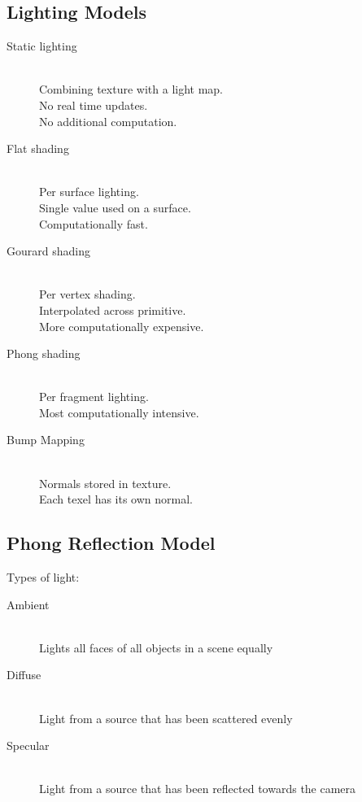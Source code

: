 \documentclass[a4paper]{article}
\begin{document}
\subsection{Lighting Models}

\begin{description}
  \item[Static lighting] \hfill \\
    Combining texture with a light map. \\
    No real time updates. \\
    No additional computation.

  \item[Flat shading] \hfill \\
    Per surface lighting. \\
    Single value used on a surface. \\
    Computationally fast.

  \item[Gourard shading] \hfill \\
    Per vertex shading. \\
    Interpolated across primitive. \\
    More computationally expensive.

  \item[Phong shading] \hfill \\
    Per fragment lighting. \\
    Most computationally intensive.

  \item[Bump Mapping] \hfill \\
    Normals stored in texture. \\
    Each texel has its own normal.

\end{description}

\subsection{Phong Reflection Model}

Types of light:

\begin{description}
  \item[Ambient] \hfill \\
    Lights all faces of all objects in a scene equally

  \item[Diffuse] \hfill \\
    Light from a source that has been scattered evenly

  \item[Specular] \hfill \\
    Light from a source that has been reflected towards the camera

\end{description}
\end{document}
